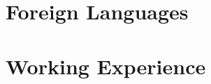 \documentclass[letterpaper]{twentysecondcv} %
\begin{document}
\section{Foreign Languages}

\begin{twenty}
\end{twenty}








\section{Working Experience}
\end{document}
